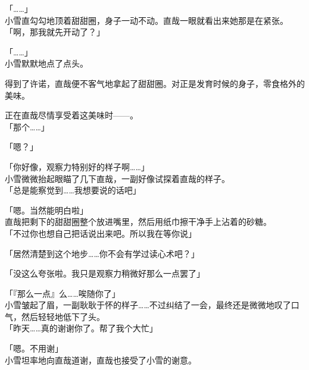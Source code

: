 「……」\\

小雪直勾勾地顶着甜甜圈，身子一动不动。直哉一眼就看出来她那是在紧张。\\

「啊，那我就先开动了？」

「……」\\

小雪默默地点了点头。

得到了许诺，直哉便不客气地拿起了甜甜圈。对正是发育时候的身子，零食格外的美味。

正在直哉尽情享受着这美味时——。\\

「那个……」

「嗯？」

「你好像，观察力特别好的样子啊……」\\

小雪微微抬起眼瞄了几下直哉，一副好像试探着直哉的样子。\\

「总是能察觉到……我想要说的话吧」

「嗯。当然能明白啦」\\

直哉把剩下的甜甜圈整个放进嘴里，然后用纸巾擦干净手上沾着的砂糖。\\

「不过你也想自己把话说出来吧。所以我在等你说」

「居然清楚到这个地步……你不会有学过读心术吧？」

「没这么夸张啦。我只是观察力稍微好那么一点罢了」

「『那么一点』么……唉随你了」\\

小雪皱起了眉，一副耿耿于怀的样子……不过纠结了一会，最终还是微微地叹了口气，然后轻轻地低下了头。\\

「昨天……真的谢谢你了。帮了我个大忙」

「嗯。不用谢」\\

小雪坦率地向直哉道谢，直哉也接受了小雪的谢意。
